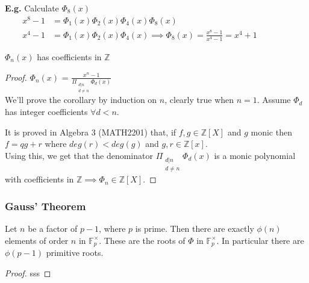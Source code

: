 \documentclass[11pt]{article}
\begin{document}
\textbf{E.g.} Calculate $\Phi_8(x)$
\begin{align*}
	x^8-1 &= \Phi_1(x) \Phi_2(x) \Phi_4(x) \Phi_8(x) &&&&&\\[1em]
	x^4-1 &= \Phi_1(x) \Phi_2(x) \Phi_4(x) \implies \Phi_8(x) = \frac{x^8-1}{x^4-1} = x^4+1 
\end{align*} 

\begin{corollary}
	$\Phi_n(x)$ has coefficients in $\mathbb{Z}$
\end{corollary}

\begin{proof}
	$\Phi_n(x)$ = \LARGE{$\frac{x^n-1}{\Pi_{\substack{d|n \\ d\neq n}}\Phi_d(x) }$}\\[0.5em]
	\normalsize
We'll prove the corollary by induction on $n$, clearly true when $n=1$. Assume $\Phi_d$ has integer coefficients $\forall d<n$.

It is proved in Algebra 3 (MATH2201) that, if $f,g \in \mathbb{Z}[X] $ and $g$ monic then $f=qg+r$ where $deg(r) < deg(g)$ and $g,r \in \mathbb{Z}[x]$. \\
Using this, we get that the denominator $\Pi_{\substack{ d|n \\ d \neq n}} \Phi_d (x) $ is a monic polynomial with coefficients in $\mathbb{Z} \implies \Phi_n \in \mathbb{Z}[X].$
\end{proof}

\subsubsection{Gauss' Theorem}
\begin{theorem}
	Let $n$ be a factor of $p-1$, where $p$ is prime. Then there are exactly $\phi(n)$ elements of order $n$ in $\mathbb{F}^\times_p$. These are the roots of $\Phi $ in $\mathbb{F}^\times_p$. In particular there are $\phi(p-1)$ primitive roots.
\end{theorem}

\begin{proof}
sss
\end{proof}




	
\end{document}
